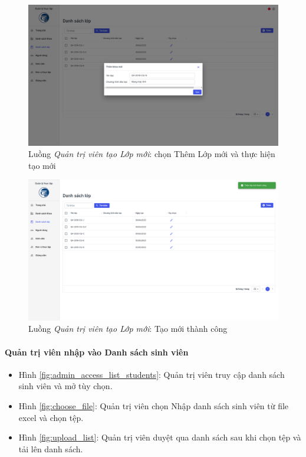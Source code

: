 \documentclass[./../main.tex]{subfiles}
\begin{document}
\begin{figure}[]
	\includegraphics[width=\linewidth]{./images/image60.png}
	\caption{Luồng \emph{Quản trị viên tạo Lớp mới}: chọn Thêm Lớp mới và thực hiện tạo mới}
	\label{fig:admin_add_class}
\end{figure}

\begin{figure}[]
	\includegraphics[width=\linewidth]{./images/image61.png}
	\caption{Luồng \emph{Quản trị viên tạo Lớp mới}: Tạo mới thành công}
	\label{fig:admin_add_class_success}
\end{figure}

\paragraph*{Quản trị viên nhập vào Danh sách sinh viên}

\begin{itemize}
	\item Hình \ref{fig:admin_access_list_students}: Quản trị viên truy cập danh sách sinh viên và mở tùy chọn. 
	\item Hình \ref{fig:choose_file}: Quản trị viên chọn Nhập danh sách sinh viên từ file excel và chọn tệp.
	\item Hình \ref{fig:upload_list}: Quản trị viên duyệt qua danh sách sau khi chọn tệp và tải lên danh sách.
\end{itemize}
\end{document}
